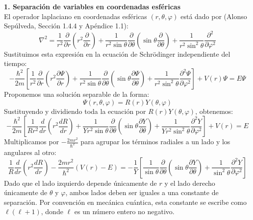 \documentclass[a4paper]{article}
\begin{document}
\vspace{0.3cm}
\noindent\textbf{1. Separación de variables en coordenadas esféricas} \\
El operador laplaciano en coordenadas esféricas $(r, \theta, \varphi)$ está dado por (Alonso Sepúlveda, Sección 1.4.4 y Apéndice 1.1):
$$
\nabla^2 = \frac{1}{r^2}\frac{\partial}{\partial r}\left(r^2\frac{\partial}{\partial r}\right) + \frac{1}{r^2\sin\theta}\frac{\partial}{\partial \theta}\left(\sin\theta\frac{\partial}{\partial \theta}\right) + \frac{1}{r^2\sin^2\theta}\frac{\partial^2}{\partial \varphi^2}
$$
Sustituimos esta expresión en la ecuación de Schrödinger independiente del tiempo:
$$
-\frac{\hbar^2}{2m} \left[ \frac{1}{r^2}\frac{\partial}{\partial r}\left(r^2\frac{\partial \Psi}{\partial r}\right) + \frac{1}{r^2\sin\theta}\frac{\partial}{\partial \theta}\left(\sin\theta\frac{\partial \Psi}{\partial \theta}\right) + \frac{1}{r^2\sin^2\theta}\frac{\partial^2 \Psi}{\partial \varphi^2} \right] + V(r)\Psi = E\Psi
$$
Proponemos una solución separable de la forma:
$$
\Psi(r, \theta, \varphi) = R(r)Y(\theta, \varphi)
$$
Sustituyendo y dividiendo toda la ecuación por $R(r)Y(\theta, \varphi)$, obtenemos:
$$
-\frac{\hbar^2}{2m} \left[ \frac{1}{R r^2}\frac{d}{dr}\left(r^2\frac{dR}{dr}\right) + \frac{1}{Y r^2\sin\theta}\frac{\partial}{\partial \theta}\left(\sin\theta\frac{\partial Y}{\partial \theta}\right) + \frac{1}{Y r^2\sin^2\theta}\frac{\partial^2 Y}{\partial \varphi^2} \right] + V(r) = E
$$
Multiplicamos por $-\frac{2mr^2}{\hbar^2}$ para agrupar los términos radiales a un lado y los angulares al otro:
$$
\frac{1}{R}\frac{d}{dr}\left(r^2\frac{dR}{dr}\right) - \frac{2mr^2}{\hbar^2}(V(r) - E) = -\frac{1}{Y} \left[ \frac{1}{\sin\theta}\frac{\partial}{\partial \theta}\left(\sin\theta\frac{\partial Y}{\partial \theta}\right) + \frac{1}{\sin^2\theta}\frac{\partial^2 Y}{\partial \varphi^2} \right]
$$
Dado que el lado izquierdo depende únicamente de $r$ y el lado derecho únicamente de $\theta$ y $\varphi$, ambos lados deben ser iguales a una constante de separación. Por convención en mecánica cuántica, esta constante se escribe como $\ell(\ell+1)$, donde $\ell$ es un número entero no negativo.
\end{document}
